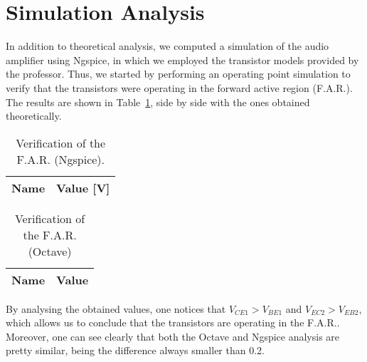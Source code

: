 \section{Simulation Analysis}
\label{sec:simulation}

In addition to theoretical analysis, we computed a simulation of the audio amplifier using Ngspice, in which we employed the transistor models provided by the professor. Thus, we started by performing an operating point simulation to verify that the transistors were operating in the forward active region (F.A.R.). The results are shown in Table~\ref{tab:opngspice}, side by side with the ones obtained theoretically.

\noindent
\begin{minipage}[c]{0.5\linewidth}

\begin{table}[H]
 \centering
 \begin{tabular}{|l|r|}
 \hline
 {\bf Name} & {\bf Value [V]} \\ \hline

 \end{tabular}
 \caption{Verification of the F.A.R. (Ngspice).}
 \label{tab:opngspice}
 \end{table}
 
\end{minipage}
\begin{minipage}[c]{0.5\linewidth}

\vspace{-1mm}
 
 \begin{table}[H]
 \centering
 \begin{tabular}{|l|r|}
 \hline
 {\bf Name} & {\bf Value} \\ \hline

 \end{tabular}
 \caption{Verification of the F.A.R. (Octave)}
 \label{tab:opoctave}
 \end{table}
 
\end{minipage}

\vspace{3mm}

By analysing the obtained values, one notices that $V_{CE1}>V_{BE1}$ and $V_{EC2}>V_{EB2}$, which allows us to conclude that the transistors are operating in the F.A.R.. Moreover, one can see clearly that both the Octave and Ngspice analysis are pretty similar, being the difference always smaller than 0.2.\\

